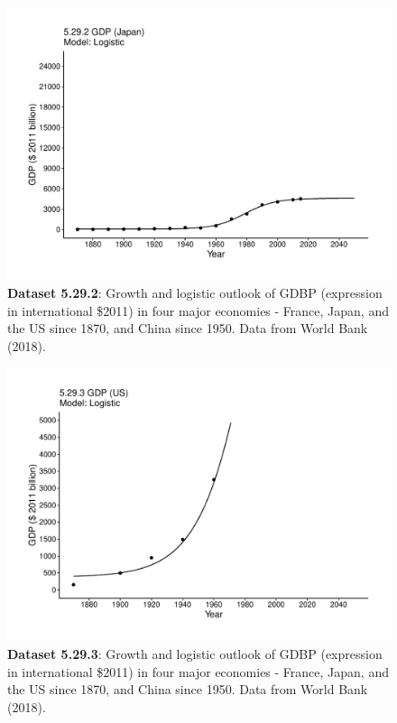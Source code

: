 \documentclass[aps,rmp,preprint,superscriptaddress,10pt,onecolumn]{article}
\begin{document}
\clearpage
\begin{figure}[h]
\includegraphics[width=\textwidth]{output/figs-ggplot/5.29.2.pdf}
\caption{\textbf{Dataset 5.29.2}: Growth and logistic outlook of GDBP (expression in international \$2011) in four major economies - France, Japan, and the US since 1870, and China since 1950. Data from World Bank (2018).}
\end{figure}
	
\clearpage
\begin{figure}[h]
\includegraphics[width=\textwidth]{output/figs-ggplot/5.29.3.pdf}
\caption{\textbf{Dataset 5.29.3}: Growth and logistic outlook of GDBP (expression in international \$2011) in four major economies - France, Japan, and the US since 1870, and China since 1950. Data from World Bank (2018).}
\end{figure}
	
\end{document}
